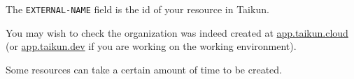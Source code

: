 \begin{tip}
The \texttt{EXTERNAL-NAME} field is the id of your resource in Taikun.
\end{tip}

You may wish to check the organization was indeed created at
\href{https://app.taikun.cloud/organizations}{app.taikun.cloud} 
(or  \href{https://app.taikun.dev/organizations}{app.taikun.dev} if you are working on the working environment).

\begin{note}
Some resources can take a certain amount of time to be created.
\end{note}
